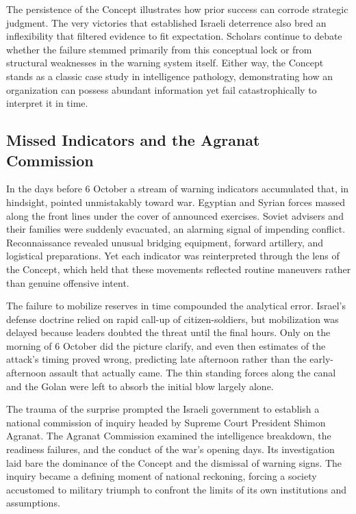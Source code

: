 The persistence of the Concept illustrates how prior success can corrode strategic judgment. The very victories that established Israeli deterrence also bred an inflexibility that filtered evidence to fit expectation. Scholars continue to debate whether the failure stemmed primarily from this conceptual lock or from structural weaknesses in the warning system itself. Either way, the Concept stands as a classic case study in intelligence pathology, demonstrating how an organization can possess abundant information yet fail catastrophically to interpret it in time. \cite{siniver2013} \cite{dayan1976} \cite{bregman2002}

\subsection{Missed Indicators and the Agranat Commission}
In the days before 6 October a stream of warning indicators accumulated that, in hindsight, pointed unmistakably toward war. Egyptian and Syrian forces massed along the front lines under the cover of announced exercises. Soviet advisers and their families were suddenly evacuated, an alarming signal of impending conflict. Reconnaissance revealed unusual bridging equipment, forward artillery, and logistical preparations. Yet each indicator was reinterpreted through the lens of the Concept, which held that these movements reflected routine maneuvers rather than genuine offensive intent.

The failure to mobilize reserves in time compounded the analytical error. Israel's defense doctrine relied on rapid call-up of citizen-soldiers, but mobilization was delayed because leaders doubted the threat until the final hours. Only on the morning of 6 October did the picture clarify, and even then estimates of the attack's timing proved wrong, predicting late afternoon rather than the early-afternoon assault that actually came. The thin standing forces along the canal and the Golan were left to absorb the initial blow largely alone.

The trauma of the surprise prompted the Israeli government to establish a national commission of inquiry headed by Supreme Court President Shimon Agranat. The Agranat Commission examined the intelligence breakdown, the readiness failures, and the conduct of the war's opening days. Its investigation laid bare the dominance of the Concept and the dismissal of warning signs. The inquiry became a defining moment of national reckoning, forcing a society accustomed to military triumph to confront the limits of its own institutions and assumptions.

